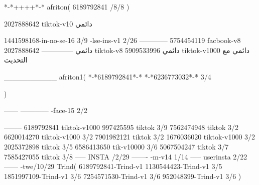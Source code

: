 *-*++++*-*
afriton(
6189792841 /8/8
)

2027888642 tiktok-v10
دائمي

1441598168-in-no-se-16 3/9
-lse-ins-v1 2/26
------------
5754454119 facbook-v8
دائمي
--------------
2027888642 tiktok-v8
دائمي
5909533996 tiktok-v1000
دائمي مع التحديث

__________
afriton1(
*-*6189792841*-*
*-*6236773032*-* 3/4

)


------
------------
-face-15 2/2

--------
6189792841 tiktok-v1000
997425595 tiktok 3/9
7562474948 tiktok 3/2
6620014270 tiktok-v1000 3/2
7901982121 tiktok 3/2
1676036020 tiktok-v1000 3/2
2025372898 tiktok  3/5
6586413650 tik-v10000 3/6
5067504247 tiktok 3/7
7585427055 tiktok 3/8
-----
 INSTA /2/29
-------
-m-v14 1/14
-----
userinsta 2/22
------
-twe/10/29
Trind(
6189792841-Trind-v1 
1130544423-Trind-v1 3/5
1851997109-Trind-v1 3/6
7254571530-Trind-v1 3/6
952048399-Trind-v1 3/6
)

